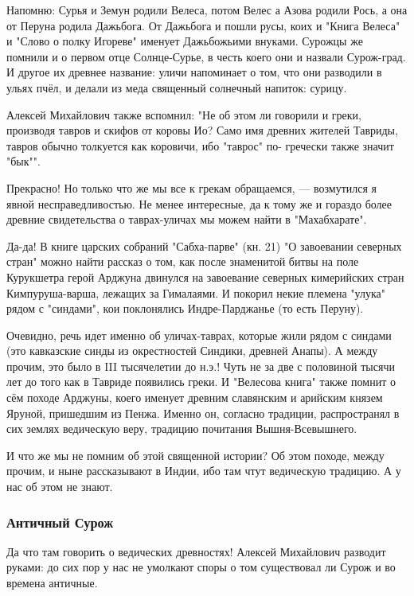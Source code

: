 Напомню: Сурья и Земун родили Велеса, потом Велес а Азова родили Рось, а она от
Перуна родила Дажьбога. От Дажьбога и пошли русы, коих и "Книга Велеса" и
"Слово о полку Игореве" именует Дажьбожьими внуками. Сурожцы же помнили и о
первом отце Солнце-Сурье, в честь коего они и назвали Сурож-град. И другое их
древнее название: уличи напоминает о том, что они разводили в ульях пчёл, и
делали из меда священный сол­нечный напиток: сурицу.

Алексей Михайлович также вспомнил: "Не об этом ли говорили и греки, производя
тавров и скифов от коровы Ио? Само имя древних жителей Тавриды, тавров обычно
толкуется как коровичи, ибо "таврос" по- гречески также значит "бык"".

Прекрасно! Но только что же мы все к грекам обращаемся, — возмутился я явной
несправедливостью. Не менее интересные, да к тому же и гораздо более древние
свидетельства о таврах-уличах мы можем найти в "Махабхарате".

Да-да! В книге царских собраний "Сабха-парве" (кн. 21) "О завоевании северных
стран" можно найти рассказ о том, как после знаменитой битвы на поле Курукшетра
герой Арджуна двинулся на заво­евание северных кимерийских стран
Кимпуруша-варша, лежа­щих за Гима­лаями. И покорил некие племена "улука" рядом
с "син­дами", кои покло­нялись Индре-Парджанье (то есть Перуну).

Очевидно, речь идет именно об уличах-таврах, которые жили рядом с синдами (это
кавказские синды из окрестностей Синдики, древней Анапы). А между прочим, это
было в III тысячелетии до н.э.! Чуть не за две с половиной тысячи лет до того
как в Тавриде появились греки. И "Велесова книга" также помнит о сём походе
Арджуны, коего именует древ­ним сла­вянским и арийским князем Яруной, пришедшим
из Пенжа. Именно он, согласно традиции, распространял в сих землях ведическую
веру, традицию почитания Вышня-Всевышнего.

И что же мы не помним об этой священной истории? Об этом походе, между прочим,
и ныне рассказывают в Индии, ибо там чтут ведическую тра­дицию. А у нас об этом
не знают.

\subsubsection{Античный Сурож}

Да что там говорить о ведических древностях! Алексей Михайлович разводит
руками: до сих пор у нас не умолкают споры о том существовал ли Сурож и во
времена античные.

